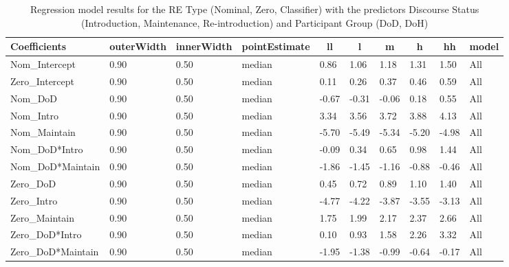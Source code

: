 \documentclass[review]{elsarticle} %
\begin{document}
\begin{table}[hbt!]

\begin{center}
\begin{threeparttable}

\caption{\label{tab:unnamed-chunk-4}Regression model results for the RE Type (Nominal, Zero, Classifier) with the predictors Discourse Status (Introduction, Maintenance, Re-introduction) and Participant Group (DoD, DoH)}

\small{

\begin{tabular}{llllllllll}
\toprule
Coefficients & \multicolumn{1}{c}{outerWidth} & \multicolumn{1}{c}{innerWidth} & \multicolumn{1}{c}{pointEstimate} & \multicolumn{1}{c}{ll} & \multicolumn{1}{c}{l} & \multicolumn{1}{c}{m} & \multicolumn{1}{c}{h} & \multicolumn{1}{c}{hh} & \multicolumn{1}{c}{model}\\
\midrule
Nom\_Intercept & 0.90 & 0.50 & median & 0.86 & 1.06 & 1.18 & 1.31 & 1.50 & All\\
Zero\_Intercept & 0.90 & 0.50 & median & 0.11 & 0.26 & 0.37 & 0.46 & 0.59 & All\\
Nom\_DoD & 0.90 & 0.50 & median & -0.67 & -0.31 & -0.06 & 0.18 & 0.55 & All\\
Nom\_Intro & 0.90 & 0.50 & median & 3.34 & 3.56 & 3.72 & 3.88 & 4.13 & All\\
Nom\_Maintain & 0.90 & 0.50 & median & -5.70 & -5.49 & -5.34 & -5.20 & -4.98 & All\\
Nom\_DoD*Intro & 0.90 & 0.50 & median & -0.09 & 0.34 & 0.65 & 0.98 & 1.44 & All\\
Nom\_DoD*Maintain & 0.90 & 0.50 & median & -1.86 & -1.45 & -1.16 & -0.88 & -0.46 & All\\
Zero\_DoD & 0.90 & 0.50 & median & 0.45 & 0.72 & 0.89 & 1.10 & 1.40 & All\\
Zero\_Intro & 0.90 & 0.50 & median & -4.77 & -4.22 & -3.87 & -3.55 & -3.13 & All\\
Zero\_Maintain & 0.90 & 0.50 & median & 1.75 & 1.99 & 2.17 & 2.37 & 2.66 & All\\
Zero\_DoD*Intro & 0.90 & 0.50 & median & 0.10 & 0.93 & 1.58 & 2.26 & 3.32 & All\\
Zero\_DoD*Maintain & 0.90 & 0.50 & median & -1.95 & -1.38 & -0.99 & -0.64 & -0.17 & All\\
\bottomrule
\end{tabular}

}

\end{threeparttable}
\end{center}

\end{table}
\end{document}
